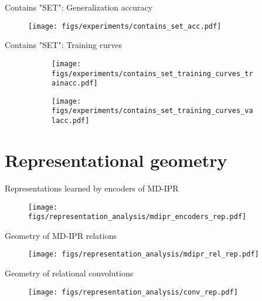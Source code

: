 \documentclass{beamer}
\begin{document}
\begin{frame}{Contains "SET": Generalization accuracy}
  \begin{figure}
    \centering
    \texttt{[image: figs/experiments/contains\_set\_acc.pdf]}
  \end{figure}
\end{frame}

\begin{frame}{Contains "SET": Training curves}
  \begin{figure}
    \centering
    \begin{subfigure}{0.49\textwidth}
      \centering
      \texttt{[image: figs/experiments/contains\_set\_training\_curves\_trainacc.pdf]}
    \end{subfigure}
    \begin{subfigure}{0.49\textwidth}
      \centering
      \texttt{[image: figs/experiments/contains\_set\_training\_curves\_valacc.pdf]}
    \end{subfigure}
  \end{figure}
\end{frame}


\section{Representational geometry}

\begin{frame}{Representations learned by encoders of MD-IPR}
  \begin{figure}
    \centering
    \texttt{[image: figs/representation\_analysis/mdipr\_encoders\_rep.pdf]}
  \end{figure}
\end{frame}

\begin{frame}{Geometry of MD-IPR relations}
  \begin{figure}
    \centering
    \texttt{[image: figs/representation\_analysis/mdipr\_rel\_rep.pdf]}
  \end{figure}
\end{frame}

\begin{frame}{Geometry of relational convolutions}
  \begin{figure}
    \centering
    \texttt{[image: figs/representation\_analysis/conv\_rep.pdf]}
  \end{figure}
\end{frame}
\end{document}
